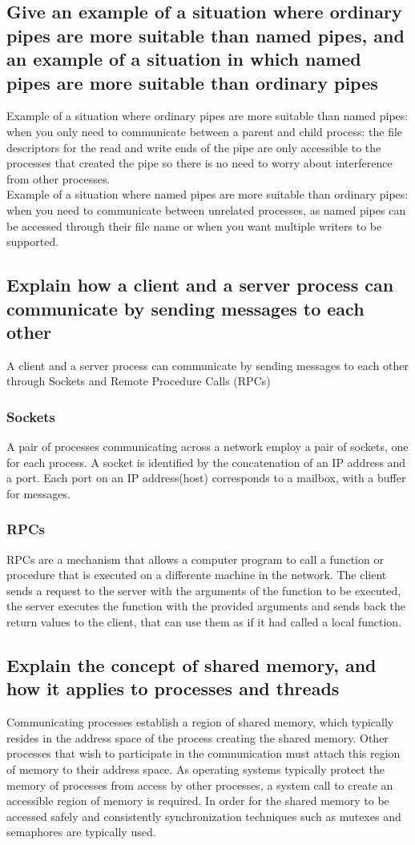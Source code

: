 \documentclass{article}
\begin{document}
\subsection{Give an example of a situation where ordinary pipes are more suitable than named pipes, and an example of a situation in which named pipes are more suitable than ordinary pipes}
Example of a situation where ordinary pipes are more suitable than named pipes: when you only need to communicate between a parent and child process: the file descriptors for the read and write ends of the pipe are only accessible to the processes that created the pipe so there is no need to worry about interference from other processes.\\
Example of a situation where named pipes are more suitable than ordinary pipes: when you need to communicate between unrelated processes, as named pipes can be accessed through their file name or when you want multiple writers to be supported.

\subsection{Explain how a client and a server process can communicate by sending messages to each other}
A client and a server process can communicate by sending messages to each other through Sockets and Remote Procedure Calls (RPCs)
\subsubsection{Sockets}
A pair of processes communicating across a network employ a pair of sockets, one for each process. A socket is identified by the concatenation of an IP address and a port. Each port on an IP address(host) corresponds to a mailbox, with a buffer for messages.
\subsubsection{RPCs}
RPCs are a mechanism that allows a computer program to call a function or procedure that is executed on a differente machine in the network. The client sends a request to the server with the arguments of the function to be executed, the server executes the function with the provided arguments and sends back the return values to the client, that can use them as if it had called a local function.

\subsection{Explain the concept of shared memory, and how it applies to processes and threads}
Communicating processes establish a region of shared memory, which typically resides in the address space of the process creating the shared memory. Other processes that wish to participate in the communication must attach this region of memory to their address space. As operating systems typically protect the memory of processes from access by other processes, a system call to create an accessible region of memory is required. In order for the shared memory to be accessed safely and consistently synchronization techniques such as mutexes and semaphores are typically used.
\end{document}
